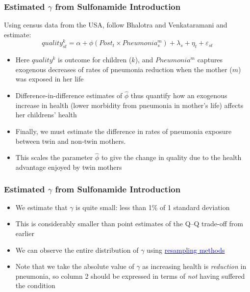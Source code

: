 \documentclass[9pt,letterpaper,subeqn]{beamer}
\begin{document}
\begin{frame}[label=gammaEst1]
  \frametitle{Estimated $\gamma$ from Sulfonamide Introduction}
  Using census data from the USA, follow Bhalotra and Venkataramani and estimate:
  \[
  quality^k_{st} = \alpha + \phi(Post_t\times Pneumonia_s^m)+\lambda_s+\eta_t + \varepsilon_{st}
  \]
  \begin{itemize}
  \item Here $quality^k$ is outcome for children ($k$), and $Pneumonia^m$ captures exogenous decreases of rates of pneumonia reduction when the mother ($m$) was exposed in her life
  \item Difference-in-difference estimates of $\hat\phi$ thus quantify how an exogenous increase in health (lower morbidity from pneumonia in mother's life) affects her childrens' health
  \item Finally, we must estimate the difference in rates of pneumonia exposure between twin and non-twin mothers.
  \item This scales the parameter $\hat\phi$ to give the change in quality due to the health advantage enjoyed by twin mothers
  \end{itemize}
\end{frame}

\begin{frame}[label=gammaEst]
  \frametitle{Estimated $\gamma$ from Sulfonamide Introduction}
  
  \begin{itemize}
  \item We estimate that $\gamma$ is quite small: less than 1\% of 1 standard deviation
  \item This is considerably smaller than point estimates of the Q--Q trade-off from earlier
  \item We can observe the entire distribution of $\gamma$ using \hyperlink{gammaResamp}{\textcolor{blue}{resampling methods}}
  \item Note that we take the absolute value of $\gamma$ as increasing health is \emph{reduction} in pneumonia, so column 2 should be expressed in terms of \emph{not} having suffered the condition 
  \end{itemize}
\end{frame}
\end{document}
